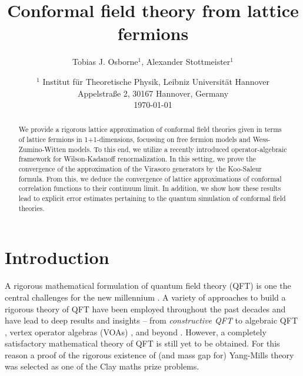 \documentclass[a4paper, 11pt]{article}
\DeclareMathOperator{\1}{\mathds{1}}
\begin{document}

\title{Conformal field theory from lattice fermions}
\author{Tobias J. Osborne${}^{1}$, Alexander Stottmeister${}^{1}$}
\date{
\small{${}^{1}$ Institut f\"ur Theoretische Physik, Leibniz Universit\"at Hannover
\\Appelstra\ss e 2, 30167 Hannover, Germany} \\[0.5cm]
\today}
\maketitle
\begin{abstract}
We provide a rigorous lattice approximation of conformal field theories given in terms of lattice fermions in 1+1-dimensions, focussing on free fermion models and Wess-Zumino-Witten models. To this end, we utilize a recently introduced operator-algebraic framework for Wilson-Kadanoff renormalization. In this setting, we prove the convergence of the approximation of the Virasoro generators by the Koo-Saleur formula. From this, we deduce the convergence of lattice approximations of conformal correlation functions to their continuum limit. In addition, we show how these results lead to explicit error estimates pertaining to the quantum simulation of conformal field theories.
\end{abstract}

\tableofcontents

\section{Introduction}
\label{sec:intro}

A rigorous mathematical formulation of quantum field theory (QFT) is one the central challenges for the new millennium \cite{seibergNathanSeiberg20152014}. A variety of approaches to build a rigorous theory of QFT have been employed throughout the past decades and have lead to deep results and insights -- from \emph{constructive QFT} \cite{GlimmQuantumFieldTheory, glimmQuantumPhysicsFunctional1987, SummersAPerspectiveOn} to algebraic QFT \cite{HaagAnAlgebraicApproach, LechnerConstructionOfQuantum, BahnsLocalNetOf}, vertex operator algebras (VOAs) \cite{BorcherdsVertexAlgebrasKac, FrenkelVertexOperatorAlgebras, FrenkelBasicRepresentationsOf, TenerGeometricRealizationOf}, and beyond \cite{segalDefinitionConformalField2004, GrosseSolutionOfThe, GubinelliAPDEConstruction}. However, a completely satisfactory mathematical theory of QFT is still yet to be obtained. For this reason a proof of the rigorous existence of (and mass gap for) Yang-Mills theory was selected as one of the Clay maths prize problems. 
\end{document}
